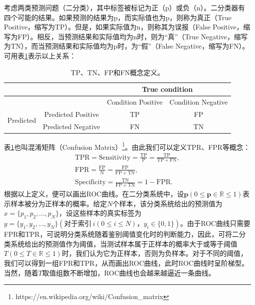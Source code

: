考虑两类预测问题（二分类），其中标签被标记为正（p）或负（n）。二分类器有四个可能的结果。如果预测的结果为p，而实际值也为p，则称为真正（True Positive，缩写为TP）。但是，如果实际值为n，则称其为误报（False Positive，缩写为FP）。相反，当预测结果和实际值均为n时，则为“真”（True Negative，缩写为TN），而当预测结果和实际值均为p时，为“假”（False Negative，缩写为FN）。可用表\ref{tab:confusion_mateix}表示以上关系：
\begin{table}[h]
	\centering
	\caption{TP、TN、FP和FN概念定义。}
	\label{tab:confusion_mateix}
	\begin{tabular}{c|c|c|c}
		\toprule[2pt]
		&                   & \multicolumn{2}{c}{True condition}     \\ 
				\midrule[2pt]
		
		&  & Condition Positive & Condition Negative \\ \hline
		\multirow{2}{*}{Predicted} & Predicted Positive & TP  & FP \\ \cline{2-4} 
		& Predicted Negative & FN & TN  \\ 
		\bottomrule[2pt]
	\end{tabular}
\end{table}

\noindent 表\ref{tab:confusion_mateix}也叫混淆矩阵（Confusion Matrix）\footnote{https://en.wikipedia.org/wiki/Confusion\_matrix}。由此我们可以定义TPR、FPR等概念：
\begin{gather}
	\mathrm{TPR}=\mathrm{Sensitivity}=\frac{\mathrm{TP}}{\mathrm{P}}=\frac{\mathrm{TP}}{\mathrm{TP}+\mathrm{FN}},\\
	\mathrm{FPR}=\frac{\mathrm{FP}}{\mathrm{N}}=\frac{\mathrm{FP}}{\mathrm{FP}+\mathrm{TN}},\\
	\mathrm{Specificity}=\frac{\mathrm{TN}}{\mathrm{FP}+\mathrm{TN}}=1-\mathrm{FPR}.
\end{gather}
根据以上定义，便可以画出ROC曲线。在二分类系统中，设$\boldsymbol{p}(0\leq \boldsymbol{p}\in \mathbb{R} \leq 1)$表示样本被分为正样本的概率。给定$N$个样本，该分类系统给出的预测值为$x=\{p_1,p_2,...,p_N
\}$，设这些样本的真实标签为$y=\{y_1,y_2,...,y_N\}(\text{对于索引}\, i(0\leq i \le N)\text{，}y_i\in \{0,1\})$。由于ROC曲线只需要FPR和TPR，可说明分类系统随着鉴别阈值变化时的判断能力，因此，可将二分类系统给出的预测值作为阈值，当测试样本属于正样本的概率大于或等于阈值$T(0\leq T\in \mathbb{R} \leq 1)$时，我们认为它为正样本，否则为负样本。对于不同的阈值，我们可以得到一组FPR和TPR，从而画出ROC曲线，此时ROC曲线时呈阶梯型。当然，随着$T$取值组数不断增加，ROC曲线也会越来越逼近一条曲线。

